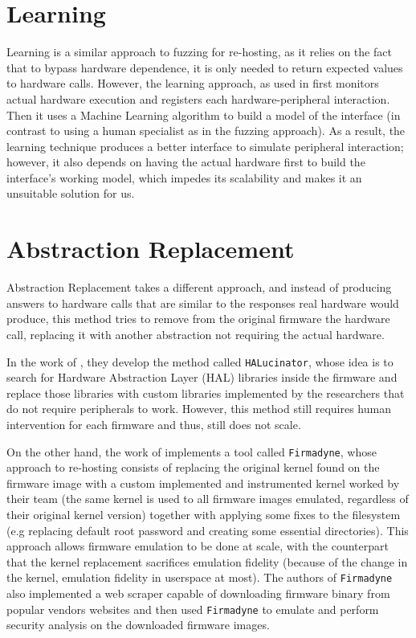 \section{Learning}

Learning is a similar approach to fuzzing for re-hosting, as it relies on the fact that to bypass hardware dependence, it is only needed to return expected values to hardware calls. However, the learning approach, as used in \cite{pretender} first monitors actual hardware execution and registers each hardware-peripheral interaction. Then it uses a Machine Learning algorithm to build a model of the interface (in contrast to using a human specialist as in the fuzzing approach). As a result, the learning technique produces a better interface to simulate peripheral interaction; however, it also depends on having the actual hardware first to build the interface's working model, which impedes its scalability and makes it an unsuitable solution for us.

\section{Abstraction Replacement}

Abstraction Replacement takes a different approach, and instead of producing answers to hardware calls that are similar to the responses real hardware would produce, this method tries to remove from the original firmware the hardware call, replacing it with another abstraction not requiring the actual hardware.

In the work of \cite{halucinator}, they develop the method called {\tt HALucinator}, whose idea is to search for Hardware Abstraction Layer (HAL) libraries inside the firmware and replace those libraries with custom libraries implemented by the researchers that do not require peripherals to work. However, this method still requires human intervention for each firmware and thus, still does not scale.

On the other hand, the work of \cite{firmadyne} implements a tool called {\tt Firmadyne}, whose approach to re-hosting consists of replacing the original kernel found on the firmware image with a custom implemented and instrumented kernel worked by their team (the same kernel is used to all firmware images emulated, regardless of their original kernel version) together with applying some fixes to the filesystem (e.g replacing default root password and creating some essential directories). This approach allows firmware emulation to be done at scale, with the counterpart that the kernel replacement sacrifices emulation fidelity (because of the change in the kernel, emulation fidelity in userspace at most). The authors of {\tt Firmadyne} also implemented a web scraper capable of downloading firmware binary from popular vendors websites and then used {\tt Firmadyne} to emulate and perform security analysis on the downloaded firmware images.

